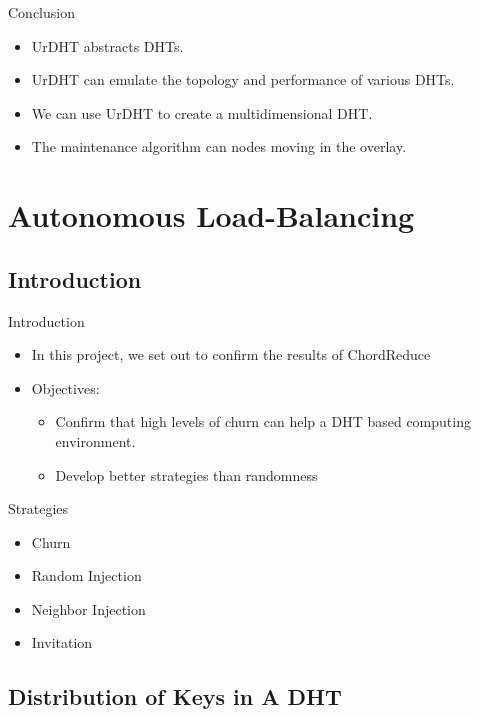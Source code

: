 \documentclass[11pt]{beamer}
\begin{document}
\begin{frame}{Conclusion}
\begin{itemize}
	\item UrDHT abstracts DHTs.
	\item UrDHT can emulate the topology and performance of various DHTs.
	\item We can use UrDHT to create a multidimensional DHT.
	\item The maintenance algorithm can nodes moving in the overlay.

\end{itemize}
\end{frame}

\section{Autonomous Load-Balancing}

\subsection{Introduction}
\begin{frame}{Introduction}
	\begin{itemize}
		
		\item In this project, we set out to confirm the results of ChordReduce
		\item Objectives:
		\begin{itemize}
			\item Confirm that high levels of churn can help a DHT based computing environment.
			\item Develop better strategies than randomness
		\end{itemize}
	\end{itemize}
\end{frame}


\begin{frame}{Strategies}
	\begin{itemize}
		\item Churn
		\item Random Injection
		\item Neighbor Injection
		\item Invitation
	\end{itemize}
\end{frame}




\subsection{Distribution of Keys in A DHT}
\end{document}
